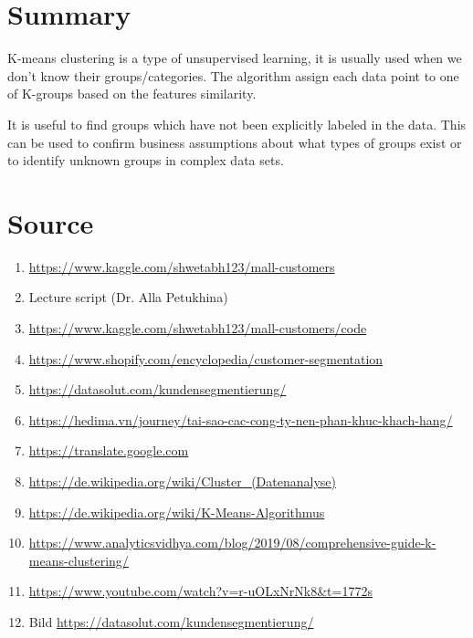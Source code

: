 \documentclass{article}
\begin{document}
\begin{itemize}
\end{itemize}

\vspace{5cm}
\section{Summary}
K-means clustering is a type of unsupervised learning, it is usually used when we don't know their groups/categories. The algorithm assign each data point to one of K-groups based on the features similarity.

It is useful to find groups which have not been explicitly labeled in the data. This can be used to confirm business assumptions about what types of groups exist or to identify unknown groups in complex data sets.

\section{Source}
\begin{enumerate} 


\item \href{https://www.kaggle.com/shwetabh123/mall-customers}{https://www.kaggle.com/shwetabh123/mall-customers}
\item Lecture script (Dr. Alla Petukhina)
\item \href{https://www.kaggle.com/shwetabh123/mall-customers/code}{https://www.kaggle.com/shwetabh123/mall-customers/code}
\item \href{https://www.shopify.com/encyclopedia/customer-segmentation}{https://www.shopify.com/encyclopedia/customer-segmentation}
\item \href{https://datasolut.com/kundensegmentierung/}{https://datasolut.com/kundensegmentierung/}
\item \href{https://hedima.vn/journey/tai-sao-cac-cong-ty-nen-phan-khuc-khach-hang/}{https://hedima.vn/journey/tai-sao-cac-cong-ty-nen-phan-khuc-khach-hang/}
\item \href{https://translate.google.com}{https://translate.google.com}
\item \href{https://de.wikipedia.org/wiki/Cluster_(Datenanalyse)}{https://de.wikipedia.org/wiki/Cluster_(Datenanalyse)}
\item \href{https://de.wikipedia.org/wiki/K-Means-Algorithmus}{https://de.wikipedia.org/wiki/K-Means-Algorithmus}
\item \href{https://www.analyticsvidhya.com/blog/2019/08/comprehensive-guide-k-means-clustering/}{https://www.analyticsvidhya.com/blog/2019/08/comprehensive-guide-k-means-clustering/}
\item \href{https://www.youtube.com/watch?v=r-uOLxNrNk8&t=1772s}{https://www.youtube.com/watch?v=r-uOLxNrNk8&t=1772s}
\item Bild \href{https://datasolut.com/kundensegmentierung/}{https://datasolut.com/kundensegmentierung/}
\end{enumerate}
\end{document}
